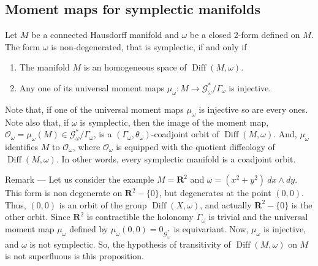 \documentclass[10pt,reqno,twoside]{amsart}
\newcommand{\RR}{\mathbf{R}}
\newcommand{\cG}{\mathcal{G}}
\newcommand{\cO}{\mathcal{O}}
\DeclareMathOperator{\Diff}{Diff}
\theoremstyle{plain}
\theoremstyle{definition}
\newcommand{\article}[1]{\subsection{#1}}
\begin{document}
  \article{Moment maps for symplectic manifolds}
  \label{Moment-maps-for-symplectic-manifolds}
  Let $M$ be a connected Hausdorff manifold and $\omega$ be a closed 2-form defined on $M$.
  The form $\omega$ is non-degenerated,
  that is symplectic,
  if and only if
  \begin{enumerate}
    \item The manifold $M$ is an homogeneous space of $\Diff(M,\omega)$.
    \item Any one of its universal moment maps $\mu_\omega : M \to \cG^*_\omega/\Gamma_\omega$ is injective.
  \end{enumerate}
  Note that,
  if one of the universal moment maps $\mu_\omega$ is injective so are every ones.
  Note also that,
  if $\omega$ is symplectic,
  then the image of the moment map,
  $\cO_\omega = \mu_\omega(M) \in \cG^*_\omega/\Gamma_\omega$,
  is a $(\Gamma_\omega,\theta_\omega)$-coadjoint orbit of $\Diff(M,\omega)$.
  And,
  $\mu_\omega$ identifies $M$ to $\cO_\omega$,
  where $\cO_\omega$ is equipped with the quotient diffeology of $\Diff(M,\omega)$.
  In other words,
  every symplectic manifold is a coadjoint orbit.
  
  {\sc Remark} --- Let us consider the example $M = \RR^2$ and $\omega = (x^2 + y^2)\ dx \wedge dy$.
  This form is non degenerate on $\RR^2 - \{0\}$,
  but degenerates at the point $(0,0)$.
  Thus,
  $(0,0)$ is an orbit of the group $\Diff(X,\omega)$,
  and actually $\RR^2 -\{0\}$ is the other orbit.
  Since $\RR^2$ is contractible the holonomy $\Gamma_\omega$ is trivial and the universal moment map $\mu_\omega$ defined by $\mu_\omega(0,0) = 0_{\cG_\omega^*}$ is equivariant.
  Now,
  $\mu_\omega$ is injective,
  and $\omega$ is not symplectic.
  So,
  the hypothesis of transitivity of $\Diff(M,\omega)$ on $M$ is not superfluous is this proposition.
  
\end{document}
